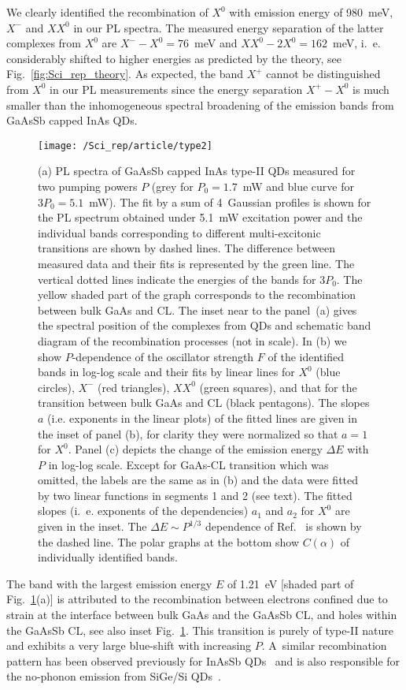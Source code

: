 We clearly identified the recombination of $X^0$ with emission energy of 980~meV, $X^-$ and $XX^0$ in our PL spectra. The measured energy separation of the latter complexes from $X^0$ are $X^- - X^0=76$~meV and $XX^0-2X^0=162$~meV, i.~e. considerably shifted to higher energies as predicted by the theory, see Fig.~\ref{fig:Sci_rep_theory}. As expected, the band $X^+$ cannot be distinguished from $X^0$ in our PL measurements since the energy separation $X^+-X^0$ is much smaller than the inhomogeneous spectral broadening of the emission bands from GaAsSb capped InAs QDs.
%
\begin{figure}
	\centering
	\texttt{[image: /Sci\_rep/article/type2]}
	\caption{(a) PL spectra of GaAsSb capped InAs type-II QDs measured for two pumping powers $P$ (grey for $P_0=1.7$~mW and blue curve for $3P_0=5.1$~mW). The fit by a sum of 4~Gaussian profiles is shown for the PL spectrum obtained under 5.1~mW excitation power and the individual bands corresponding to different multi-excitonic transitions are shown by dashed lines. The difference between measured data and their fits is represented by the green line. The vertical dotted lines indicate the energies of the bands for $3P_0$. The yellow shaded part of the graph corresponds to the recombination between bulk GaAs and CL. The inset near to the panel~(a) gives the spectral position of the complexes from QDs and schematic band diagram of the recombination processes (not in scale). In (b) we show $P$-dependence of the oscillator strength $F$ of the identified bands in log-log scale and their fits by linear lines for $X^0$ (blue circles), $X^-$ (red triangles), $XX^0$ (green squares), and that for the transition between bulk GaAs and CL (black pentagons). The slopes $a$ (i.e. exponents in the linear plots) of the fitted lines are given in the inset of panel (b), for clarity they were normalized so that $a=1$ for $X^0$. Panel (c) depicts the change of the emission energy $\Delta E$ with $P$ in log-log scale. Except for GaAs-CL transition which was omitted, the labels are the same as in (b) and the data were fitted by two linear functions in segments 1 and 2 (see text). The fitted slopes (i.~e. exponents of the dependencies) $a_1$ and $a_2$ for $X^0$ are given in the inset. The $\Delta E\sim P^{1/3}$ dependence of Ref.~\citep{Hatami1998} is shown by the dashed line. The polar graphs at the bottom show $C(\alpha)$ of individually identified bands.}
	\label{fig:sci_rep_typeII}
\end{figure}

The band with the largest emission energy $E$ of 1.21~eV [shaded part of Fig.~\ref{fig:sci_rep_typeII}(a)] is attributed to the recombination between electrons confined due to strain at the interface between bulk GaAs and the GaAsSb CL, and holes within the GaAsSb CL, see also inset Fig.~\ref{fig:sci_rep_typeII}. This transition is purely of type-II nature and exhibits a very large blue-shift with increasing $P$. A~similar recombination pattern has been observed previously for InAsSb QDs~\cite{Mazur2012} and is also responsible for the no-phonon emission from SiGe/Si QDs~\cite{SiGeKlenovsky}. 

